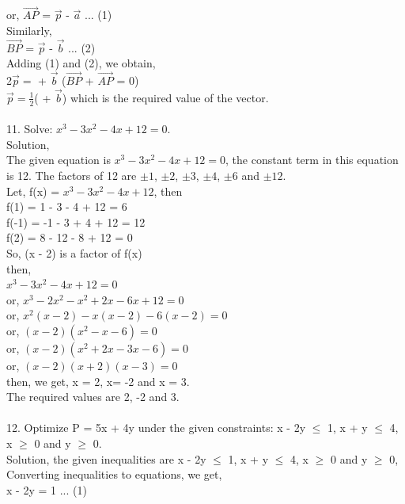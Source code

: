 \documentclass[a4paper,17pt]{extarticle}
\begin{document}
{or, $\overrightarrow{AP}$ = $\overrightarrow{p}$ - $\overrightarrow{a}$ ... (1) \\
Similarly, \\
$\overrightarrow{BP}$ = $\overrightarrow{p}$ - $\overrightarrow{b}$ ... (2) \\ 
Adding (1) and (2), we obtain, \\
2$\overrightarrow{p} = $ + $\overrightarrow{b}$ ($\overrightarrow{BP}$ + $\overrightarrow{AP}$ = 0) \\
$\overrightarrow{p} = \frac{1}{2}$( + $\overrightarrow{b}$) 
which is the required value of the vector. \\ \\ 
11. Solve: $x^3 - 3x^2 - 4x + 12 = 0$. \\ 
Solution, \\
The given equation is $x^3 - 3x^2 - 4x + 12 = 0$, the constant term in this equation is 12. The factors of 12 are $\pm1$, $\pm2$, $\pm3$, $\pm4$, $\pm6$ and $\pm12$. \\ 
Let, f(x) = $x^3 - 3x^2 - 4x + 12$, then \\
f(1) = 1 - 3 - 4 + 12 = 6 \\
f(-1) = -1 - 3 + 4 + 12 = 12 \\
f(2) = 8 - 12 - 8 + 12 = 0 \\
So, (x - 2) is a factor of f(x) \\
then, \\
$x^3 - 3x^2 - 4x + 12 = 0$ \\ 
or, $x^3 - 2x^2 - x^2 + 2x - 6x + 12 = 0$ \\
or, $x^2(x - 2) - x(x - 2) - 6(x - 2)= 0$ \\
or, $(x - 2)(x^2 - x- 6) = 0$ \\
or, $(x - 2)(x^2 + 2x - 3x- 6) = 0$ \\
or, $(x - 2)(x + 2)(x - 3) = 0$ \\
then, we get, x = 2, x= -2 and x = 3. \\
The required values are 2, -2 and 3. \\ \\
12. Optimize P = 5x + 4y under the given constraints: x - 2y $\leq$ 1, x + y $\leq$ 4, x $\geq$ 0 and y $\geq$ 0. \\
Solution, the given inequalities are x - 2y $\leq$ 1, x + y $\leq$ 4, x $\geq$ 0 and y $\geq$ 0, \\
Converting inequalities to equations, we get, \\
x - 2y = 1 ... (1) \\
}
\end{document}
